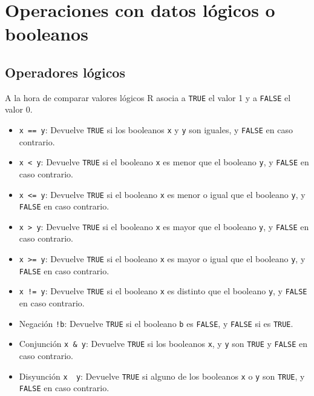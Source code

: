 \documentclass[
  spanish,
  a4paper,
]{scrreport}
\providecommand{\tightlist}{%
  \setlength{\itemsep}{0pt}\setlength{\parskip}{0pt}}
\theoremstyle{definition}
\theoremstyle{definition}
\theoremstyle{remark}
\begin{document}
\section{Operaciones con datos lógicos o
booleanos}\label{operaciones-con-datos-luxf3gicos-o-booleanos}

\subsection{Operadores lógicos}\label{operadores-luxf3gicos}

A la hora de comparar valores lógicos R asocia a \texttt{TRUE} el valor
1 y a \texttt{FALSE} el valor 0.

\begin{itemize}
\tightlist
\item
  \texttt{x\ ==\ y}: Devuelve \texttt{TRUE} si los booleanos \texttt{x}
  y \texttt{y} son iguales, y \texttt{FALSE} en caso contrario.
\item
  \texttt{x\ \textless{}\ y}: Devuelve \texttt{TRUE} si el booleano
  \texttt{x} es menor que el booleano \texttt{y}, y \texttt{FALSE} en
  caso contrario.
\item
  \texttt{x\ \textless{}=\ y}: Devuelve \texttt{TRUE} si el booleano
  \texttt{x} es menor o igual que el booleano \texttt{y}, y
  \texttt{FALSE} en caso contrario.
\item
  \texttt{x\ \textgreater{}\ y}: Devuelve \texttt{TRUE} si el booleano
  \texttt{x} es mayor que el booleano \texttt{y}, y \texttt{FALSE} en
  caso contrario.
\item
  \texttt{x\ \textgreater{}=\ y}: Devuelve \texttt{TRUE} si el booleano
  \texttt{x} es mayor o igual que el booleano \texttt{y}, y
  \texttt{FALSE} en caso contrario.
\item
  \texttt{x\ !=\ y}: Devuelve \texttt{TRUE} si el booleano \texttt{x} es
  distinto que el booleano \texttt{y}, y \texttt{FALSE} en caso
  contrario.
\item
  Negación \texttt{!b}: Devuelve \texttt{TRUE} si el booleano \texttt{b}
  es \texttt{FALSE}, y \texttt{FALSE} si es \texttt{TRUE}.
\item
  Conjunción \texttt{x\ \&\ y}: Devuelve \texttt{TRUE} si los booleanos
  \texttt{x}, y \texttt{y} son \texttt{TRUE} y \texttt{FALSE} en caso
  contrario.
\item
  Disyunción \texttt{x\ \textbar{}\ y}: Devuelve \texttt{TRUE} si alguno
  de los booleanos \texttt{x} o \texttt{y} son \texttt{TRUE}, y
  \texttt{FALSE} en caso contrario.
\end{itemize}
\end{document}
